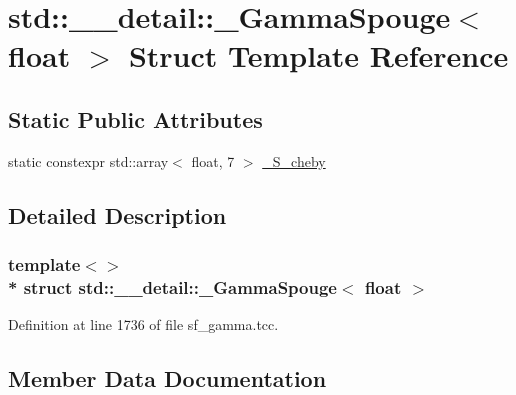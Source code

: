 \hypertarget{structstd_1_1____detail_1_1__GammaSpouge_3_01float_01_4}{}\section{std\+:\+:\+\_\+\+\_\+detail\+:\+:\+\_\+\+Gamma\+Spouge$<$ float $>$ Struct Template Reference}
\label{structstd_1_1____detail_1_1__GammaSpouge_3_01float_01_4}
\subsection*{Static Public Attributes}
\begin{DoxyCompactItemize}
\item 
static constexpr std\+::array$<$ float, 7 $>$ \hyperlink{structstd_1_1____detail_1_1__GammaSpouge_3_01float_01_4_a68acee4e85813ec5364a4a67f8eddeb7}{\+\_\+\+S\+\_\+cheby}
\end{DoxyCompactItemize}


\subsection{Detailed Description}
\subsubsection*{template$<$$>$\\*
struct std\+::\+\_\+\+\_\+detail\+::\+\_\+\+Gamma\+Spouge$<$ float $>$}



Definition at line 1736 of file sf\+\_\+gamma.\+tcc.



\subsection{Member Data Documentation}

